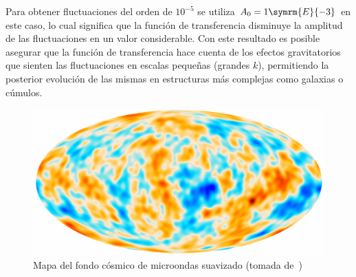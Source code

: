 Para obtener fluctuaciones del orden de \(10^{-5}\) se utiliza \(A_0=1\symrm{E}{-3}\) en este caso, lo cual significa que la función de transferencia disminuye la amplitud de las fluctuaciones en un valor considerable. Con este resultado es posible asegurar que la función de transferencia hace cuenta de los efectos gravitatorios que sienten las fluctuaciones en escalas pequeñas (grandes \(k\)), permitiendo la posterior evolución de las mismas en estructuras más complejas como galaxias o cúmulos.
\begin{figure}[t]
    \centering
    \includegraphics[scale=.6]{img/Planck_2018_Pol_CMB.pdf}
    \caption[Mapa del fondo cósmico de microondas suavizado]{Mapa del fondo cósmico de microondas suavizado (tomada de~\cite{collaboration2020planck4})}
    \label{fig::cmbpdf}
\end{figure}
